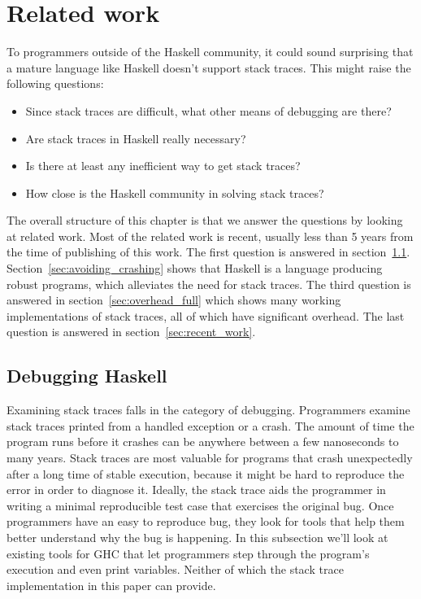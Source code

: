 \chapter{Related work} \label{chp:related_work}

To programmers outside of the Haskell community, it could sound
surprising that a mature language like Haskell doesn't support stack
traces. This might raise the following questions:

\begin{itemize}
  \itemsep1pt\parskip0pt
  \item
    Since stack traces are difficult, what other means of debugging are
    there?
  \item
    Are stack traces in Haskell really necessary?
  \item
    Is there at least any inefficient way to get stack traces?
  \item
    How close is the Haskell community in solving stack traces?
\end{itemize}

The overall structure of this chapter is that we answer the questions
by looking at related work. Most of the
related work is recent, usually less than 5 years from the time of
publishing of this work. The first question is answered in section~\ref{sec:debugging_haskell}. Section~\ref{sec:avoiding_crashing}
shows that Haskell is a language producing robust programs, which
alleviates the need for stack traces.
The third question is answered in section~\ref{sec:overhead_full} which shows many working implementations of
stack traces, all of which have significant overhead. The last question
is answered in section~\ref{sec:recent_work}.

\section{Debugging Haskell} \label{sec:debugging_haskell}

Examining stack traces falls in the category of debugging. Programmers
examine stack traces printed from a handled exception or a
crash. The amount of time the program runs before it crashes can be
anywhere between a few nanoseconds to many years. Stack traces are most
valuable for programs that crash unexpectedly after a long time of
stable execution, because it might be hard to reproduce the error in
order to diagnose it. Ideally, the stack trace aids the programmer in
writing a minimal reproducible test case that exercises the original
bug. Once programmers have an easy to reproduce bug, they look for
tools that help them better understand why the bug is happening. In this
subsection we'll look at existing tools for GHC that let programmers
step through the program's execution and even print variables. Neither of
which the stack trace implementation in this paper can provide.

